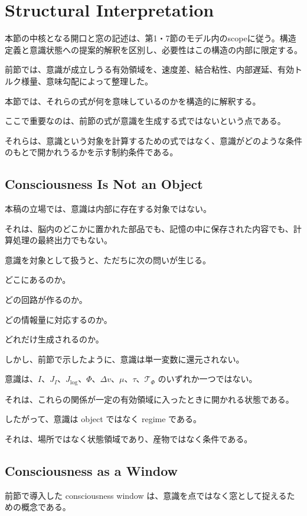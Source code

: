 \section{Structural Interpretation}

本節の中核となる開口と窓の記述は、第1・7節のモデル内のscopeに従う。構造定義と意識状態への提案的解釈を区別し、必要性はこの構造の内部に限定する。


前節では、意識が成立しうる有効領域を、速度差、結合粘性、内部遅延、有効トルク様量、意味勾配によって整理した。

本節では、それらの式が何を意味しているのかを構造的に解釈する。

ここで重要なのは、前節の式が意識を生成する式ではないという点である。

それらは、意識という対象を計算するための式ではなく、意識がどのような条件のもとで開かれうるかを示す制約条件である。

\subsection{Consciousness Is Not an Object}

本稿の立場では、意識は内部に存在する対象ではない。

それは、脳内のどこかに置かれた部品でも、記憶の中に保存された内容でも、計算処理の最終出力でもない。

意識を対象として扱うと、ただちに次の問いが生じる。

どこにあるのか。

どの回路が作るのか。

どの情報量に対応するのか。

どれだけ生成されるのか。

しかし、前節で示したように、意識は単一変数に還元されない。

意識は、$I$、$J_I$、$J_{\log}$、$\Phi$、$\Delta v$、$\mu$、$\tau$、$\mathcal{T}_{\Phi}$ のいずれか一つではない。

それは、これらの関係が一定の有効領域に入ったときに開かれる状態である。

したがって、意識は object ではなく regime である。

それは、場所ではなく状態領域であり、産物ではなく条件である。

\subsection{Consciousness as a Window}

前節で導入した consciousness window は、意識を点ではなく窓として捉えるための概念である。

